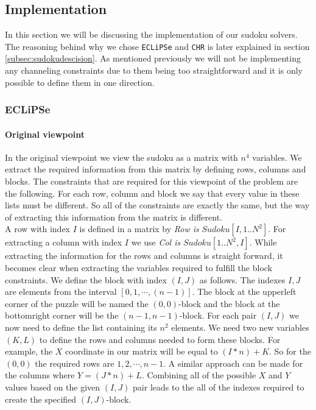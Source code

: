 \subsection{Implementation}

In this section we will be discussing the implementation of our sudoku solvers.
The reasoning behind why we chose \texttt{ECLiPSe} and \texttt{CHR} is later explained in section \ref{subsec:sudokudescision}.
As mentioned previously we will not be implementing any channeling constraints due to them being too straightforward and it is only possible to define them in one direction.

\subsubsection{ECLiPSe}
\paragraph*{Original viewpoint}
In the original viewpoint we view the sudoku as a matrix with $n^{4}$ variables.
We extract the required information from this matrix by defining rows, columns and blocks.
The constraints that are required for this viewpoint of the problem are the following.
For each row, column and block we say that every value in these lists must be different.
So all of the constraints are exactly the same, but the way of extracting this information from the matrix is different.\\

A row with index $I$ is defined in a matrix by \textit{Row is} $Sudoku[I,1..N^{2}]$. 
For extracting a column with index $I$ we use \textit{Col is } $Sudoku[1..N^{2},I]$.
While extracting the information for the rows and columns is straight forward, it becomes clear when extracting the variables required to fulfill the block constraints.
We define the block with index $(I,J)$ as follows. 
The indexes $I, J$ are elements from the interval $[0,1,\cdots,(n-1)]$.
The block at the upperleft corner of the puzzle will be named the $(0,0)$-block and the block at the bottomright corner will be the $(n-1,n-1)$-block.
For each pair $(I,J)$ we now need to define the list containing its $n^{2}$ elements.
We need two new variables $(K,L)$ to define the rows and columns needed to form these blocks.
For example, the $X$ coordinate in our matrix will be equal to $(I*n)+K$. 
So for the $(0,0)$ the required rows are $1,2,\cdots,n-1$.
A similar approach can be made for the columns where $Y = (J*n)+L$.
Combining all of the possible $X$ and $Y$ values based on the given $(I,J)$ pair leads to the all of the indexes required to create the specified $(I,J)$-block.

